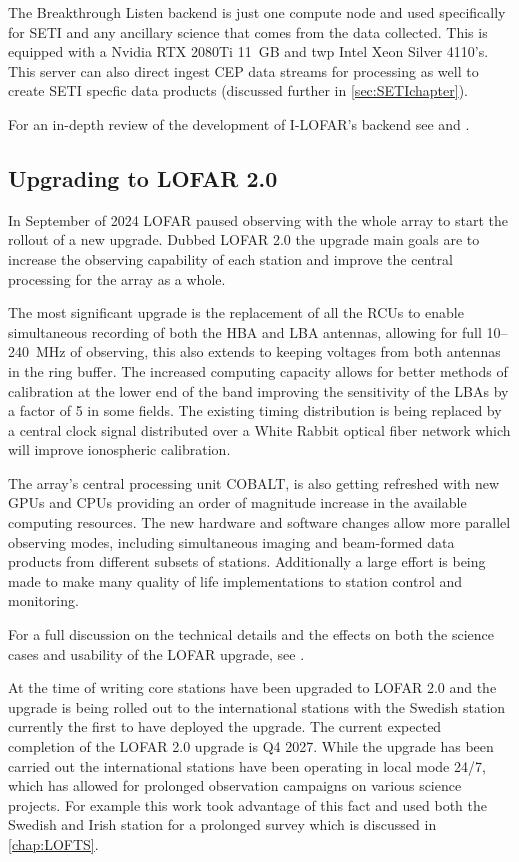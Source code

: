 The Breakthrough Listen backend is just one compute node and used specifically for SETI and any ancillary science that comes from the data collected. This is equipped with a Nvidia RTX 2080Ti 11~GB and twp Intel Xeon Silver 4110's. This server can also direct ingest CEP data streams for processing as well to create SETI specfic data products (discussed further in \cref{sec:SETIchapter}).

For an in-depth review of the development of I-LOFAR's backend see \citet[chap. 3,][]{david_thesis} and \cite{RealTa_paper}. 

\subsection{Upgrading to LOFAR 2.0} \label{sec:upgradetoLOFAR2}

In September of 2024 LOFAR paused observing with the whole array to start the rollout of a new upgrade. Dubbed LOFAR 2.0 the upgrade main goals are to increase the observing capability of each station and improve the central processing for the array as a whole.

The most significant upgrade is the replacement of all the RCUs to enable simultaneous recording of both the HBA and LBA antennas, allowing for full 10--240~MHz of observing, this also extends to keeping voltages from both antennas in the ring buffer. The increased computing capacity allows for better methods of calibration at the lower end of the band improving the sensitivity of the LBAs by a factor of 5 in some fields. The existing timing distribution is being replaced by a central clock signal distributed over a White Rabbit optical fiber network which will improve ionospheric calibration. 

The array's central processing unit COBALT, is also getting refreshed with new GPUs and CPUs providing an order of magnitude increase in the available computing resources. The new hardware and software changes allow more parallel observing modes, including simultaneous imaging and beam-formed data products from different subsets of stations. Additionally a large effort is being made to make many quality of life implementations to station control and monitoring. 

For a full discussion on the technical details and the effects on both the science cases and usability of the LOFAR upgrade, see \cite{LOFAR2}. 

At the time of writing core stations have been upgraded to LOFAR 2.0 and the upgrade is being rolled out to the international stations with the Swedish station currently the first to have deployed the upgrade. The current expected completion of the LOFAR 2.0 upgrade is Q4 2027. While the upgrade has been carried out the international stations have been operating in local mode 24/7, which has allowed for prolonged observation campaigns on various science projects. For example this work took advantage of this fact and used both the Swedish and Irish station for a prolonged survey which is discussed in \cref{chap:LOFTS}. 


